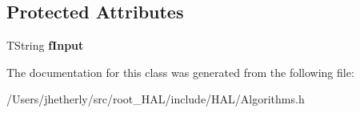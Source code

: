 \subsection*{Protected Attributes}
\begin{DoxyCompactItemize}
\item 
\hypertarget{class_h_a_l_1_1internal_1_1_filter_particle_algo_a20288e7c1011165da5a13f5709eaeb7f}{T\-String {\bfseries f\-Input}}\label{class_h_a_l_1_1internal_1_1_filter_particle_algo_a20288e7c1011165da5a13f5709eaeb7f}

\end{DoxyCompactItemize}


The documentation for this class was generated from the following file\-:\begin{DoxyCompactItemize}
\item 
/\-Users/jhetherly/src/root\-\_\-\-H\-A\-L/include/\-H\-A\-L/Algorithms.\-h\end{DoxyCompactItemize}
